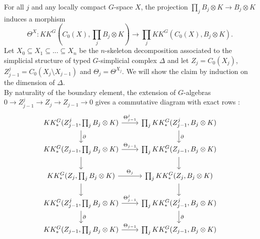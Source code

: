 \begin{dem}
For all $j$ and any locally compact $G$-space $X$, the projection $\prod_j B_j\otimes K\rightarrow B_j \otimes K$ induces a morphism
\[\Theta^X : KK^G(C_0(X),\prod_j B_j\otimes K )\rightarrow \prod_j  KK^G(C_0(X),B_j\otimes K ).\]
Let $X_0\subseteq X_1 \subseteq...\subseteq X_n$ be the $n$-skeleton decomposition associated to the simplicial structure of typed $G$-simplicial complex $\Delta$ and let $Z_j = C_0(X_j)$, $Z^j_{j-1} = C_0(X_j \setminus X_{j-1})$ and $\Theta_j = \Theta^{X_j}$.
We will show the claim by induction on the dimension of $\Delta$.\\

By naturality of the boundary element, the extension of $G$-algebras $0\rightarrow Z^j_{j-1} \rightarrow Z_j \rightarrow Z_{j-1}\rightarrow 0$ gives a commutative diagram with exact rows :
\[\begin{tikzcd}
KK^G_*(Z^j_{j-1},\prod_j B_j\otimes K)\arrow{d}{\partial}\arrow{r}{\Theta^j_{j-1}} & \prod_j KK^G_*( Z^j_{j-1},B_j \otimes K)\arrow{d}{\partial}  \\
KK^G_*(Z_{j-1},\prod_j B_j\otimes K)\arrow{d}\arrow{r}{\Theta_{j-1}}  & \prod_j KK^G_*( Z_{j-1},B_j \otimes K)\arrow{d} \\
KK^G_*(Z_j,\prod_j B_j\otimes K)\arrow{d}\arrow{r}{\Theta_j} & \prod_j KK^G_*( Z_j,B_j \otimes K)\arrow{d} \\
KK^G_*(Z^j_{j-1},\prod_j B_j\otimes K)\arrow{d}{\partial}\arrow{r}{\Theta^j_{j-1}} & \prod_j KK^G_*( Z^j_{j-1},B_j \otimes K)\arrow{d}{\partial}\\
KK^G_*(Z_{j-1},\prod_j B_j\otimes K)\arrow{r}{\Theta_{j-1}} & \prod_j KK^G_*( Z_{j-1},B_j \otimes K)
\end{tikzcd}\]


\end{dem}
